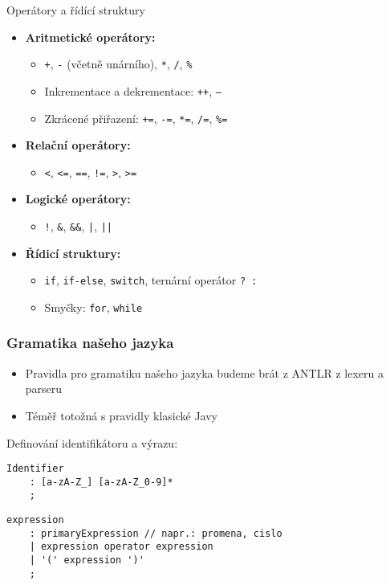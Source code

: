 \documentclass[11pt]{beamer}
\begin{document}
\begin{frame}{Operátory a řídící struktury}
\begin{itemize}
        \item \textbf{Aritmetické operátory:}
        \begin{itemize}
            \item \texttt{+}, \texttt{-} (včetně unárního), \texttt{*}, \texttt{/}, \texttt{\%}
            \item Inkrementace a dekrementace: \texttt{++}, \texttt{--}
            \item Zkrácené přiřazení: \texttt{+=}, \texttt{-=}, \texttt{*=}, \texttt{/=}, \texttt{\%=}
        \end{itemize}
        \item \textbf{Relační operátory:}
        \begin{itemize}
            \item \texttt{<}, \texttt{<=}, \texttt{==}, \texttt{!=}, \texttt{>}, \texttt{>=}
        \end{itemize}
        \item \textbf{Logické operátory:}
        \begin{itemize}
            \item \texttt{!}, \texttt{\&}, \texttt{\&\&}, \texttt{|}, \texttt{||}
        \end{itemize}
        \item \textbf{Řídicí struktury:}
        \begin{itemize}
            \item \texttt{if}, \texttt{if-else}, \texttt{switch}, ternární operátor \texttt{? :}
            \item Smyčky: \texttt{for}, \texttt{while}
        \end{itemize}
    \end{itemize}
\end{frame}
\begin{frame}[fragile]
\frametitle{Gramatika našeho jazyka}
\begin{itemize}
	\item Pravidla pro gramatiku našeho jazyka budeme brát z ANTLR z lexeru a parseru
	\item Téměř totožná s pravidly klasické Javy
\end{itemize}
\vspace{.5cm}
Definování identifikátoru a výrazu:
\begin{lstlisting}
Identifier
    : [a-zA-Z_] [a-zA-Z_0-9]*
    ;
\end{lstlisting}
\begin{lstlisting}
expression
    : primaryExpression // napr.: promena, cislo
    | expression operator expression 
    | '(' expression ')'    
    ;
\end{lstlisting}
\end{frame}
\end{document}
